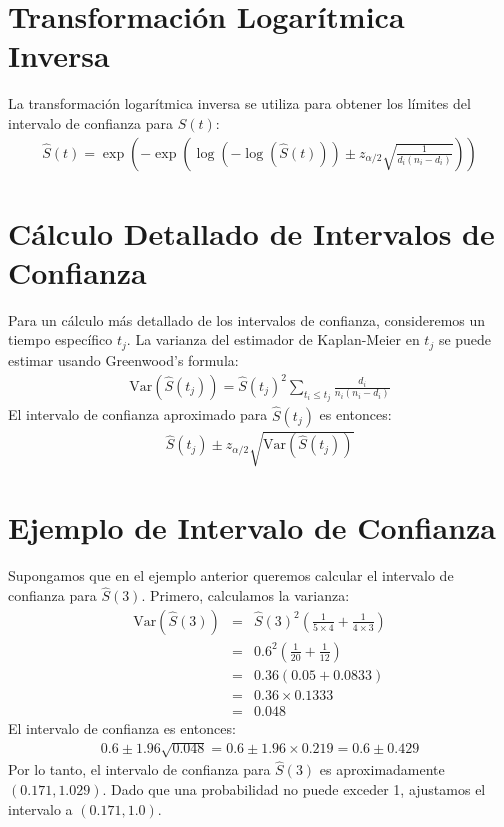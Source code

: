 \documentclass[a4paper]{report} %
\begin{document}
\section{Transformaci\'on Logar\'itmica Inversa}
La transformaci\'on logar\'itmica inversa se utiliza para obtener los l\'imites del intervalo de confianza para $S(t)$:
\begin{eqnarray*}
\hat{S}(t) = \exp\left(-\exp\left(\log(-\log(\hat{S}(t))) \pm z_{\alpha/2} \sqrt{\frac{1}{d_i(n_i - d_i)}}\right)\right)
\end{eqnarray*}

\section{C\'alculo Detallado de Intervalos de Confianza}
Para un c\'alculo m\'as detallado de los intervalos de confianza, consideremos un tiempo espec\'ifico $t_j$. La varianza del estimador de Kaplan-Meier en $t_j$ se puede estimar usando Greenwood's formula:
\begin{eqnarray*}
\text{Var}(\hat{S}(t_j)) = \hat{S}(t_j)^2 \sum_{t_i \leq t_j} \frac{d_i}{n_i(n_i - d_i)}
\end{eqnarray*}
El intervalo de confianza aproximado para $\hat{S}(t_j)$ es entonces:
\begin{eqnarray*}
\hat{S}(t_j) \pm z_{\alpha/2} \sqrt{\text{Var}(\hat{S}(t_j))}
\end{eqnarray*}

\section{Ejemplo de Intervalo de Confianza}
Supongamos que en el ejemplo anterior queremos calcular el intervalo de confianza para $\hat{S}(3)$. Primero, calculamos la varianza:
\begin{eqnarray*}
\text{Var}(\hat{S}(3)) &=& \hat{S}(3)^2 \left( \frac{1}{5 \times 4} + \frac{1}{4 \times 3} \right) \\
                       &=& 0.6^2 \left( \frac{1}{20} + \frac{1}{12} \right) \\
                       &=& 0.36 \left( 0.05 + 0.0833 \right) \\
                       &=& 0.36 \times 0.1333 \\
                       &=& 0.048
\end{eqnarray*}
El intervalo de confianza es entonces:
\begin{eqnarray*}
0.6 \pm 1.96 \sqrt{0.048} = 0.6 \pm 1.96 \times 0.219 = 0.6 \pm 0.429
\end{eqnarray*}
Por lo tanto, el intervalo de confianza para $\hat{S}(3)$ es aproximadamente $(0.171, 1.029)$. Dado que una probabilidad no puede exceder 1, ajustamos el intervalo a $(0.171, 1.0)$.
\end{document}
